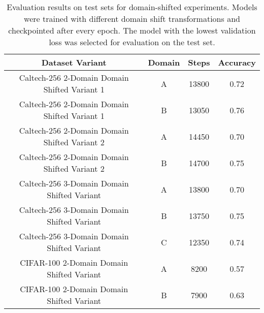 \begin{table}[ht]
\centering
\caption{Evaluation results on test sets for domain-shifted experiments. Models were trained with different domain shift transformations and checkpointed after every epoch. The model with the lowest validation loss was selected for evaluation on the test set.}
\label{tab:evaluation_results_domain_shifted}
\begin{tabular}{cccc}
\toprule
Dataset Variant & Domain & Steps & Accuracy \\
\midrule
Caltech-256 2-Domain Domain Shifted Variant 1 & A & 13800 & 0.72 \\
Caltech-256 2-Domain Domain Shifted Variant 1 & B & 13050 & 0.76 \\
Caltech-256 2-Domain Domain Shifted Variant 2 & A & 14450 & 0.70 \\
Caltech-256 2-Domain Domain Shifted Variant 2 & B & 14700 & 0.75 \\
Caltech-256 3-Domain Domain Shifted Variant & A & 13800 & 0.70 \\
Caltech-256 3-Domain Domain Shifted Variant & B & 13750 & 0.75 \\
Caltech-256 3-Domain Domain Shifted Variant & C & 12350 & 0.74 \\
CIFAR-100 2-Domain Domain Shifted Variant & A & 8200 & 0.57 \\
CIFAR-100 2-Domain Domain Shifted Variant & B & 7900 & 0.63 \\
\bottomrule
\end{tabular}
\end{table}

